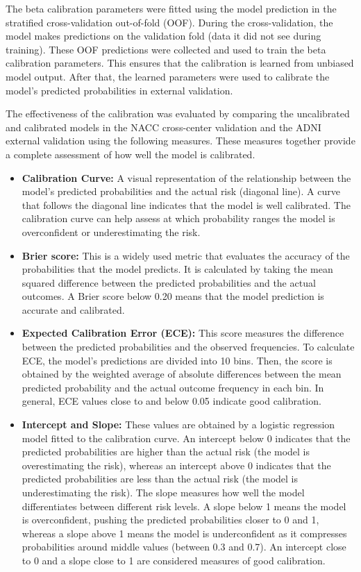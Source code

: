 The beta calibration parameters were fitted using the model prediction in the stratified cross-validation out-of-fold (OOF). During the cross-validation, the model makes predictions on the validation fold (data it did not see during training). These OOF predictions were collected and used to train the beta calibration parameters. This ensures that the calibration is learned from unbiased model output. After that, the learned parameters were used to calibrate the model's predicted probabilities in external validation.

The effectiveness of the calibration was evaluated by comparing the uncalibrated and calibrated models in the NACC cross-center validation and the ADNI external validation using the following measures. These measures together provide a complete assessment of how well the model is calibrated.

\begin{itemize}
    \item \textbf{Calibration Curve:} A visual representation of the relationship between the model's predicted probabilities and the actual risk (diagonal line). A curve that follows the diagonal line indicates that the model is well calibrated. The calibration curve can help assess at which probability ranges the model is overconfident or underestimating the risk.
    \item \textbf{Brier score:} This is a widely used metric that evaluates the accuracy of the probabilities that the model predicts. It is calculated by taking the mean squared difference between the predicted probabilities and the actual outcomes. A Brier score below 0.20 means that the model prediction is accurate and calibrated.
    \item \textbf{Expected Calibration Error (\acrshort{ECE}):} This score measures the difference between the predicted probabilities and the observed frequencies. To calculate ECE, the model's predictions are divided into 10 bins. Then, the score is obtained by the weighted average of absolute differences between the mean predicted probability and the actual outcome frequency in each bin. In general, ECE values close to and below 0.05 indicate good calibration.
    \item \textbf{Intercept and Slope:} These values are obtained by a logistic regression model fitted to the calibration curve. An intercept below 0 indicates that the predicted probabilities are higher than the actual risk (the model is overestimating the risk), whereas an intercept above 0 indicates that the predicted probabilities are less than the actual risk (the model is underestimating the risk). The slope measures how well the model differentiates between different risk levels. A slope below 1 means the model is overconfident, pushing the predicted probabilities closer to 0 and 1, whereas a slope above 1 means the model is underconfident as it compresses probabilities around middle values (between 0.3 and 0.7). An intercept close to 0 and a slope close to 1 are considered measures of good calibration.
\end{itemize}
\vspace{2em}

